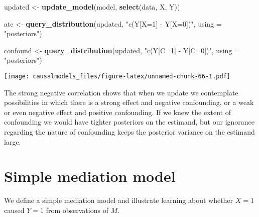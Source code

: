 \documentclass[
  12pt,
]{book}
\newenvironment{Shaded}{\begin{snugshade}}{\end{snugshade}}
\newcommand{\AttributeTok}[1]{\textcolor[rgb]{0.13,0.29,0.53}{#1}}
\newcommand{\FunctionTok}[1]{\textcolor[rgb]{0.13,0.29,0.53}{\textbf{#1}}}
\newcommand{\NormalTok}[1]{#1}
\newcommand{\OtherTok}[1]{\textcolor[rgb]{0.56,0.35,0.01}{#1}}
\newcommand{\StringTok}[1]{\textcolor[rgb]{0.31,0.60,0.02}{#1}}
\begin{document}
\begin{Shaded}
\begin{Highlighting}[]
\NormalTok{updated  }\OtherTok{\textless{}{-}} \FunctionTok{update\_model}\NormalTok{(model, }\FunctionTok{select}\NormalTok{(data, X, Y))}

\NormalTok{ate }\OtherTok{\textless{}{-}} 
  \FunctionTok{query\_distribution}\NormalTok{(updated, }\StringTok{"c(Y[X=1] {-} Y[X=0])"}\NormalTok{, }\AttributeTok{using =} \StringTok{"posteriors"}\NormalTok{)}

\NormalTok{confound }\OtherTok{\textless{}{-}} 
  \FunctionTok{query\_distribution}\NormalTok{(updated, }\StringTok{"c(Y[C=1] {-} Y[C=0])"}\NormalTok{, }\AttributeTok{using =} \StringTok{"posteriors"}\NormalTok{)}
\end{Highlighting}
\end{Shaded}

\texttt{[image: causalmodels\_files/figure-latex/unnamed-chunk-66-1.pdf]}

The strong negative correlation shows that when we update we contemplate possibilities in which there is a strong effect and negative confounding, or a weak or even negative effect and positive confounding. If we knew the extent of confounding we would have tighter posteriors on the estimand, but our ignorance regarding the nature of confounding keeps the posterior variance on the estimand large.

\hypertarget{simple-mediation-model}{%
\section{Simple mediation model}\label{simple-mediation-model}}

We define a simple mediation model and illustrate learning about whether \(X=1\) caused \(Y=1\) from observations of \(M\).
\end{document}
